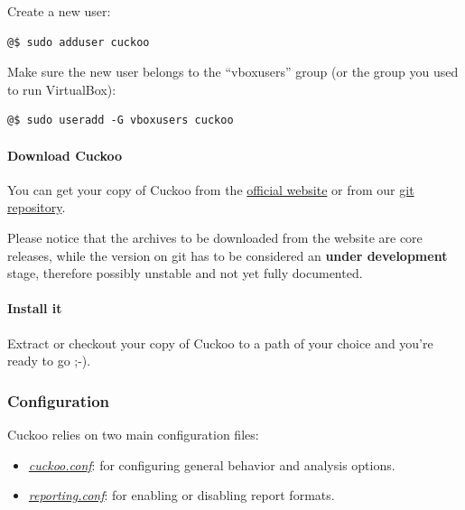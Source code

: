 \documentclass[letterpaper,10pt,english]{sphinxmanual}
\begin{document}
Create a new user:

\begin{Verbatim}[commandchars=@\[\]]
@$ sudo adduser cuckoo
\end{Verbatim}

Make sure the new user belongs to the ``vboxusers'' group (or the group you used to
run VirtualBox):

\begin{Verbatim}[commandchars=@\[\]]
@$ sudo useradd -G vboxusers cuckoo
\end{Verbatim}


\paragraph{Download Cuckoo}
\label{installation/host/installation:download-cuckoo}
You can get your copy of Cuckoo from the \href{http://www.cuckoobox.org}{official website} or from our
\href{https://github.com/cuckoobox/cuckoo}{git repository}.

Please notice that the archives to be downloaded from the website are core
releases, while the version on git has to be considered an \textbf{under
development} stage, therefore possibly unstable and not yet fully documented.


\paragraph{Install it}
\label{installation/host/installation:install-it}\label{installation/host/installation:git-repository}
Extract or checkout your copy of Cuckoo to a path of your choice and you're
ready to go ;-).


\subsubsection{Configuration}
\label{installation/host/configuration:configuration}\label{installation/host/configuration::doc}
Cuckoo relies on two main configuration files:
\begin{itemize}
\item {} 
{\hyperref[installation/host/configuration:cuckoo-conf]{\emph{cuckoo.conf}}}: for configuring general behavior and analysis options.

\item {} 
{\hyperref[installation/host/configuration:reporting-conf]{\emph{reporting.conf}}}: for enabling or disabling report formats.

\end{itemize}
\end{document}
